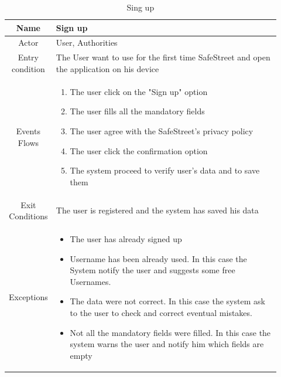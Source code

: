 \documentclass[12pt,a4paper]{report}
\begin{document}
				\begin{table}[H]
					\centering
					\begin{tabular}{|c|p{0.92\linewidth}|}
						\hline
						Name & {Sign up} \\
						\hline
						Actor & {User, Authorities} \\
						\hline
						Entry condition & {The User want to use for the first time SafeStreet and open the application on
									his device} \\
						\hline
						Events Flows &{ 
								\vskip 4pt
								\begin{enumerate}
									\item The user click on the "Sign up" option
									\item The user fills all the mandatory fields
									\item The user agree with the SafeStreet's privacy policy
									\item The user click the confirmation option
									\item The system proceed to verify user's data and to save them
								\end{enumerate}
								\vskip 4pt}\\
						\hline
						Exit Conditions & {The user is registered and the system has saved his data} \\
						\hline
						Exceptions & {
								\vskip 4pt
								\begin{itemize}
									\item The user has already signed up
									\item Username has been already used. In this case the System notify the user and
										suggests some free Usernames.
									\item The data were not correct. In this case the system ask to the user to check and
										correct eventual mistakes.
									\item Not all the mandatory fields were filled. In this case the system warns the user
										and notify him which fields are empty
								\end{itemize}
								\vskip 4pt
						} \\
						\hline
					\end{tabular}
					\caption{Sing up}
					\label{tab: }
				\end{table}
\end{document}
